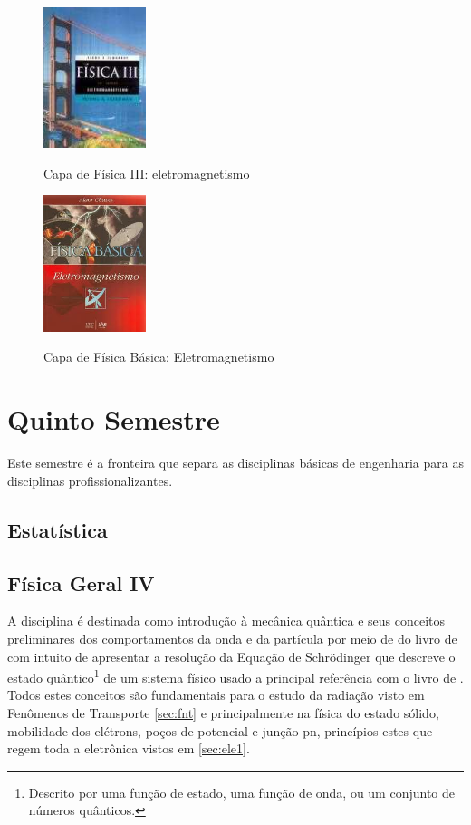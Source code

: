 \documentclass[
	12pt,				%
	openright,			%
	oneside,			%
	a4paper,			%
	english,			%
	french,				%
	spanish,			%
	brazil				%
	]{abntex2}
\begin{document}
\begin{figure}[!htb]
	\caption{Capa de Física III: eletromagnetismo}
	\centering
	\includegraphics[width=3cm]{sears.jpg}
	\label{fig:sears}
\end{figure}
\begin{figure}[!htb]
	\caption{Capa de Física Básica: Eletromagnetismo}
	\centering
	\includegraphics[width=3cm]{alaorchaves.jpg}
	\label{fig:alaorchaves}
\end{figure}

\chapter{Quinto Semestre}\label{cap:5sem}
Este semestre é a fronteira que separa as disciplinas básicas de engenharia para as disciplinas profissionalizantes.

\section{Estatística}\label{sec:est}

\section{Física Geral IV}\label{sec:fge4}
A disciplina é destinada como introdução à mecânica quântica e seus conceitos preliminares dos comportamentos da onda e da partícula por meio de do livro de  com intuito de apresentar a resolução da Equação de Schrödinger que descreve o estado quântico\footnote{Descrito por uma função de estado, uma função de onda, ou um conjunto de números quânticos.} de um sistema físico usado a principal referência com o livro de . Todos estes conceitos são fundamentais para o estudo da radiação visto em Fenômenos de Transporte \autoref{sec:fnt} e principalmente na física do estado sólido, mobilidade dos elétrons,  poços de potencial e junção pn, princípios estes que regem toda a eletrônica vistos em \autoref{sec:ele1}.
\end{document}
